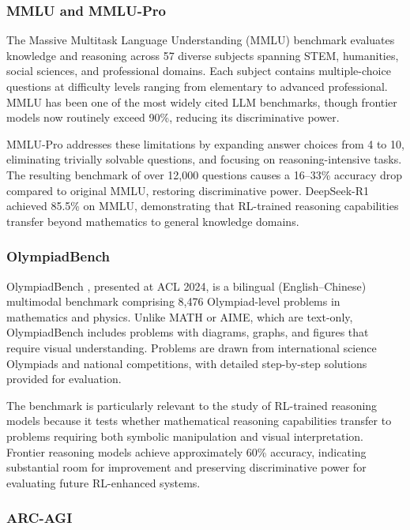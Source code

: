 \documentclass[12pt,a4paper]{report}
\theoremstyle{definition}
\begin{document}
\subsubsection{MMLU and MMLU-Pro}

The Massive Multitask Language Understanding (MMLU) benchmark \cite{hendrycks2021mmlu} evaluates knowledge and reasoning across 57 diverse subjects spanning STEM, humanities, social sciences, and professional domains. Each subject contains multiple-choice questions at difficulty levels ranging from elementary to advanced professional. MMLU has been one of the most widely cited LLM benchmarks, though frontier models now routinely exceed 90\%, reducing its discriminative power.

MMLU-Pro \cite{wang2024mmlupro} addresses these limitations by expanding answer choices from 4 to 10, eliminating trivially solvable questions, and focusing on reasoning-intensive tasks. The resulting benchmark of over 12,000 questions causes a 16--33\% accuracy drop compared to original MMLU, restoring discriminative power. DeepSeek-R1 achieved 85.5\% on MMLU, demonstrating that RL-trained reasoning capabilities transfer beyond mathematics to general knowledge domains.

\subsubsection{OlympiadBench}

OlympiadBench \cite{he2024olympiadbench}, presented at ACL 2024, is a bilingual (English--Chinese) multimodal benchmark comprising 8,476 Olympiad-level problems in mathematics and physics. Unlike MATH or AIME, which are text-only, OlympiadBench includes problems with diagrams, graphs, and figures that require visual understanding. Problems are drawn from international science Olympiads and national competitions, with detailed step-by-step solutions provided for evaluation.

The benchmark is particularly relevant to the study of RL-trained reasoning models because it tests whether mathematical reasoning capabilities transfer to problems requiring both symbolic manipulation and visual interpretation. Frontier reasoning models achieve approximately 60\% accuracy, indicating substantial room for improvement and preserving discriminative power for evaluating future RL-enhanced systems.

\subsubsection{ARC-AGI}
\end{document}
